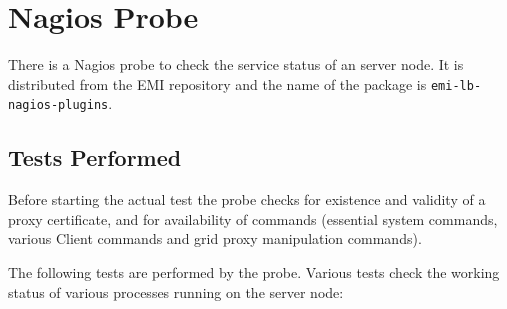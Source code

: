 %
%

\section{Nagios Probe}
\label{s:nagios}

There is a Nagios probe to check the service status of an \LB server node. It is distributed from the EMI repository and the name of the package is \texttt{emi-lb-nagios-plugins}. 

\subsection{Tests Performed}
Before starting the actual test the probe checks for existence and validity of a proxy certificate, and for availability of commands (essential system commands, various \LB Client commands and grid proxy manipulation commands).

The following tests are performed by the probe. Various tests check the working status of various processes running on the \LB server node:

